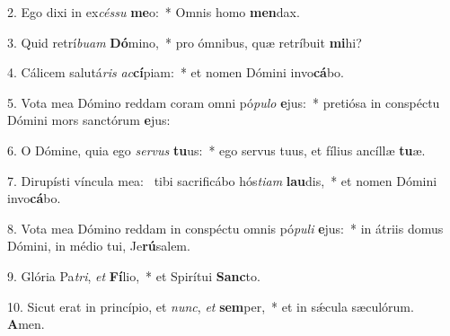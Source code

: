 2. Ego dixi in ex\textit{cés}\textit{su} \textbf{me}o:~*  Omnis homo \textbf{men}dax.\

3. Quid retrí\textit{bu}\textit{am} \textbf{Dó}mino,~*  pro ómnibus, quæ retríbuit \textbf{mi}hi?\

4. Cálicem salutá\textit{ris} \textit{ac}\textbf{cí}piam:~*  et nomen Dómini invo\textbf{cá}bo.\

5. Vota mea Dómino reddam coram omni pó\textit{pu}\textit{lo} \textbf{e}jus:~*  pretiósa in conspéctu Dómini mors sanctórum \textbf{e}jus:\

6. O Dómine, quia ego \textit{ser}\textit{vus} \textbf{tu}us:~*  ego servus tuus, et fílius ancíllæ \textbf{tu}æ.\

7. Dirupísti víncula mea: \dag\  tibi sacrificábo hós\textit{ti}\textit{am} \textbf{lau}dis,~*  et nomen Dómini invo\textbf{cá}bo.\

8. Vota mea Dómino reddam in conspéctu omnis pó\textit{pu}\textit{li} \textbf{e}jus:~*  in átriis domus Dómini, in médio tui, Je\textbf{rú}salem.\

9. Glória Pa\textit{tri}, \textit{et} \textbf{Fí}lio,~*  et Spirítui \textbf{Sanc}to.\

10. Sicut erat in princípio, et \textit{nunc}, \textit{et} \textbf{sem}per,~*  et in sǽcula sæculórum. \textbf{A}men.\

